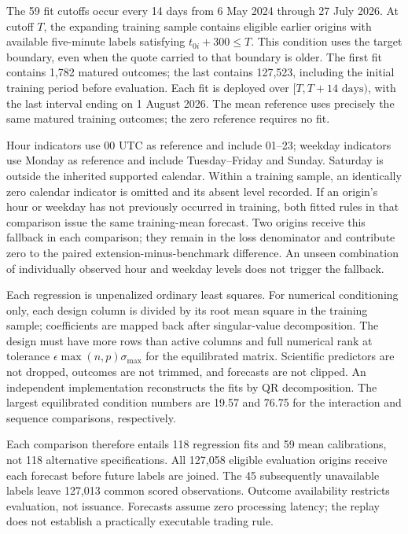\documentclass[12pt,letterpaper]{article}
\begin{document}
The 59 fit cutoffs occur every 14 days from 6 May 2024 through 27 July 2026. At cutoff $T$, the expanding training sample contains eligible earlier origins with available five-minute labels satisfying $t_{0i}+300\leq T$. This condition uses the target boundary, even when the quote carried to that boundary is older. The first fit contains 1,782 matured outcomes; the last contains 127,523, including the initial training period before evaluation. Each fit is deployed over $[T,T+14\text{ days})$, with the last interval ending on 1 August 2026. The mean reference uses precisely the same matured training outcomes; the zero reference requires no fit.

Hour indicators use 00 UTC as reference and include 01--23; weekday indicators use Monday as reference and include Tuesday--Friday and Sunday. Saturday is outside the inherited supported calendar. Within a training sample, an identically zero calendar indicator is omitted and its absent level recorded. If an origin's hour or weekday has not previously occurred in training, both fitted rules in that comparison issue the same training-mean forecast. Two origins receive this fallback in each comparison; they remain in the loss denominator and contribute zero to the paired extension-minus-benchmark difference. An unseen combination of individually observed hour and weekday levels does not trigger the fallback.

Each regression is unpenalized ordinary least squares. For numerical conditioning only, each design column is divided by its root mean square in the training sample; coefficients are mapped back after singular-value decomposition. The design must have more rows than active columns and full numerical rank at tolerance $\epsilon\max(n,p)\sigma_{\max}$ for the equilibrated matrix. Scientific predictors are not dropped, outcomes are not trimmed, and forecasts are not clipped. An independent implementation reconstructs the fits by QR decomposition. The largest equilibrated condition numbers are 19.57 and 76.75 for the interaction and sequence comparisons, respectively.

Each comparison therefore entails 118 regression fits and 59 mean calibrations, not 118 alternative specifications. All 127,058 eligible evaluation origins receive each forecast before future labels are joined. The 45 subsequently unavailable labels leave 127,013 common scored observations. Outcome availability restricts evaluation, not issuance. Forecasts assume zero processing latency; the replay does not establish a practically executable trading rule.
\end{document}
